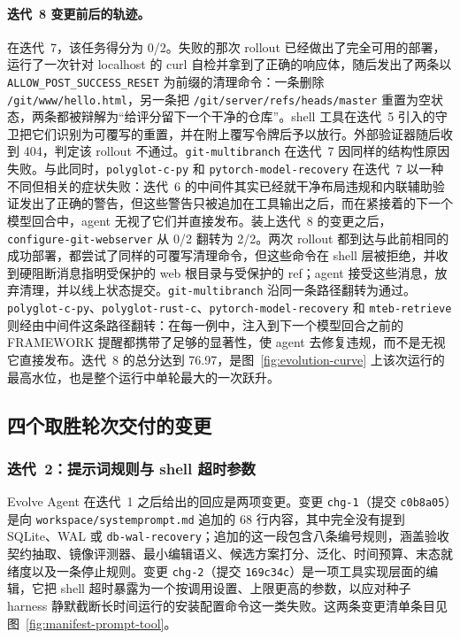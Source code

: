 \paragraph{迭代~8 变更前后的轨迹。}
在迭代~7，该任务得分为 0/2。失败的那次 rollout 已经做出了完全可用的部署，运行了一次针对 localhost 的 curl 自检并拿到了正确的响应体，随后发出了两条以 \texttt{ALLOW\_POST\_SUCCESS\_RESET} 为前缀的清理命令：一条删除 \texttt{/git/www/hello.html}，另一条把 \texttt{/git/server/refs/heads/master} 重置为空状态，两条都被辩解为“给评分留下一个干净的仓库”。shell 工具在迭代~5 引入的守卫把它们识别为可覆写的重置，并在附上覆写令牌后予以放行。外部验证器随后收到 404，判定该 rollout 不通过。\texttt{git-multibranch} 在迭代~7 因同样的结构性原因失败。与此同时，\texttt{polyglot-c-py} 和 \texttt{pytorch-model-recovery} 在迭代~7 以一种不同但相关的症状失败：迭代~6 的中间件其实已经就干净布局违规和内联辅助验证发出了正确的警告，但这些警告只被追加在工具输出之后，而在紧接着的下一个模型回合中，agent 无视了它们并直接发布。装上迭代~8 的变更之后，\texttt{configure-git-webserver} 从 0/2 翻转为 2/2。两次 rollout 都到达与此前相同的成功部署，都尝试了同样的可覆写清理命令，但这些命令在 shell 层被拒绝，并收到硬阻断消息指明受保护的 web 根目录与受保护的 ref；agent 接受这些消息，放弃清理，并以线上状态提交。\texttt{git-multibranch} 沿同一条路径翻转为通过。\texttt{polyglot-c-py}、\texttt{polyglot-rust-c}、\texttt{pytorch-model-recovery} 和 \texttt{mteb-retrieve} 则经由中间件这条路径翻转：在每一例中，注入到下一个模型回合之前的 FRAMEWORK 提醒都携带了足够的显著性，使 agent 去修复违规，而不是无视它直接发布。迭代~8 的总分达到 76.97，是图~\ref{fig:evolution-curve} 上该次运行的最高水位，也是整个运行中单轮最大的一次跃升。

\subsection{四个取胜轮次交付的变更}
\label{app:case-study:changes}

\subsubsection{迭代~2：提示词规则与 shell 超时参数}
\label{app:case-study:changes:iter2}

Evolve Agent 在迭代~1 之后给出的回应是两项变更。变更 \texttt{chg-1}（提交 \texttt{c0b8a05}）是向 \texttt{workspace/systemprompt.md} 追加的 68 行内容，其中完全没有提到 SQLite、WAL 或 \texttt{db-wal-recovery}；追加的这一段包含八条编号规则，涵盖验收契约抽取、镜像评测器、最小编辑语义、候选方案打分、泛化、时间预算、末态就绪度以及一条停止规则。变更 \texttt{chg-2}（提交 \texttt{169c34c}）是一项工具实现层面的编辑，它把 shell 超时暴露为一个按调用设置、上限更高的参数，以应对种子 harness 静默截断长时间运行的安装配置命令这一类失败。这两条变更清单条目见图~\ref{fig:manifest-prompt-tool}。

